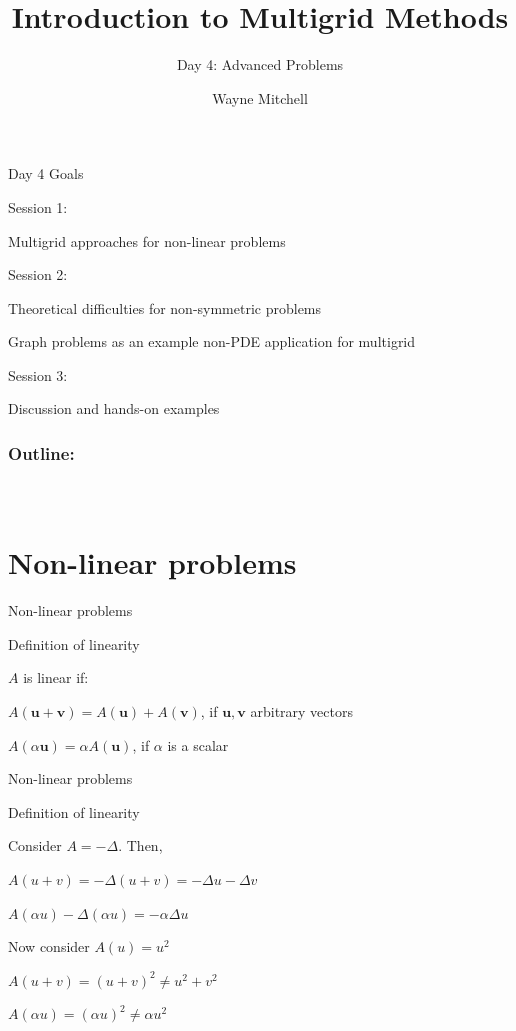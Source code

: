 \documentclass[18pt,xcolor=table]{beamer}
\title[Multigrid]{Introduction to Multigrid Methods}
\subtitle{Day 4: Advanced Problems}
\author[Mitchell]{Wayne Mitchell}
\institute{\pgfuseimage{logo}\\Universit\"at Heidelberg\\Institut f\"ur Technische Informatik}
\date[]{\alert{}}
\begin{document}


\DeclareRobustCommand{\Chi}{\raisebox{2pt}{$\chi$}}

\begin{frame}{}
\begin{block}{Day 4 Goals}
\bit
\item Session 1:
\bit
\item Multigrid approaches for non-linear problems
\eit
\item Session 2:
\bit
\item Theoretical difficulties for non-symmetric problems
\item Graph problems as an example non-PDE application for multigrid
\eit
\item Session 3:
\bit
\item Discussion and hands-on examples
\eit
\eit
\end{block}
\end{frame}

\begin{frame}
\frametitle{\bf Outline:}
\framesubtitle{~~}
\tableofcontents
\end{frame}


\section{Non-linear problems}

\begin{frame}{Non-linear problems}
\begin{block}{Definition of linearity}
\bit
\item $A$ is linear if:
\bit
\item $A(\mathbf{u} + \mathbf{v}) = A(\mathbf{u}) + A(\mathbf{v})$, if $\mathbf{u},\mathbf{v}$ arbitrary vectors
\item $A(\alpha\mathbf{u}) = \alpha A(\mathbf{u})$, if $\alpha$ is a scalar
\eit
\eit
\end{block}
\end{frame}

\begin{frame}{Non-linear problems}
\begin{block}{Definition of linearity}
\bit
\item Consider $A = -\Delta$. Then,
\bit
\item $A(u + v) = -\Delta(u + v) = -\Delta u - \Delta v$
\item $A(\alpha u) -\Delta (\alpha u) = -\alpha \Delta u$
\eit
\item Now consider $A(u) = u^2$
\bit
\item $A(u + v) = (u + v)^2 \neq u^2 + v^2$
\item $A(\alpha u) = (\alpha u)^2 \neq \alpha u^2$
\eit
\eit
\end{block}
\end{frame}
\end{document}
